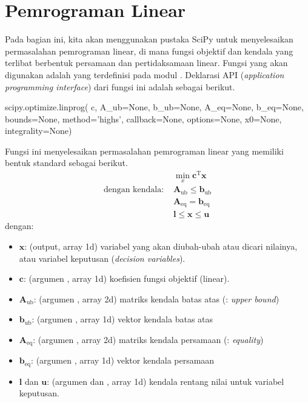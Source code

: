 \section{Pemrograman Linear}

Pada bagian ini, kita akan menggunakan pustaka SciPy untuk menyelesaikan permasalahan
pemrograman linear, di mana fungsi objektif dan kendala yang terlibat berbentuk
persamaan dan pertidaksamaan linear. Fungsi yang akan digunakan adalah 
yang terdefinisi pada modul .
Deklarasi API (\textit{application programming interface}) dari fungsi ini adalah sebagai berikut.
%
\begin{pythoncode}
scipy.optimize.linprog(
    c, A_ub=None, b_ub=None, A_eq=None, b_eq=None, bounds=None,
    method='highs', callback=None, options=None, x0=None, integrality=None)
\end{pythoncode}
%
Fungsi ini menyelesaikan permasalahan
pemrograman linear yang memiliki bentuk standard sebagai berikut.
\begin{align*}
& \min_{x} \mathbf{c}^{\mathrm{T}} \mathbf{x} \\
\text{dengan kendala:}\,\, & \mathbf{A}_{\mathrm{ub}} \leq \mathbf{b}_{\mathrm{ub}} \\
& \mathbf{A}_{\mathrm{eq}} = \mathbf{b}_{\mathrm{eq}} \\
& \mathbf{l} \leq \mathbf{x} \leq \mathbf{u}
\end{align*}
dengan:
\begin{itemize}
\item $\mathbf{x}$: (output, array 1d) variabel yang akan diubah-ubah
atau dicari nilainya, atau variabel keputusan (\textit{decision variables}).
\item $\mathbf{c}$: (argumen , array 1d) koefisien fungsi objektif (linear).
\item $\mathbf{A}_{\mathrm{ub}}$: (argumen , array 2d) matriks kendala batas atas
(: \textit{upper bound})
\item $\mathbf{b}_{\mathrm{ub}}$: (argumen , array 1d) vektor kendala batas atas
\item $\mathbf{A}_{\mathrm{eq}}$: (argumen , array 2d) matriks kendala persamaan
(: \textit{equality})
\item $\mathbf{b}_{\mathrm{eq}}$: (argumen , array 1d) vektor kendala persamaan
\item $\mathbf{l}$ dan $\mathbf{u}$: (argumen  dan ,
array 1d) kendala rentang nilai untuk
variabel keputusan.
\end{itemize}

